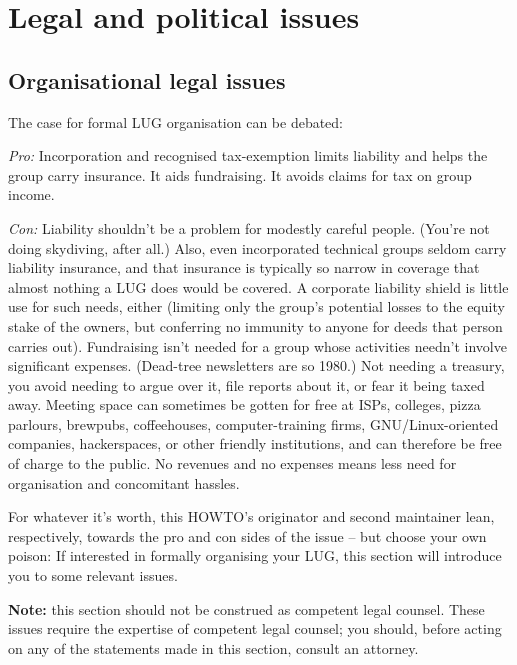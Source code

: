 

\section{Legal and political issues}






\subsection{Organisational legal issues}

The case for formal LUG organisation can be debated:

{\itshape Pro:\/} Incorporation and recognised tax-exemption limits
liability and helps the group carry insurance.  It aids fundraising.
It avoids claims for tax on group income.

{\itshape Con:\/} Liability shouldn't be a problem for modestly careful
people.  (You're not doing skydiving, after all.)  Also, even
incorporated technical groups seldom carry liability insurance, and that
insurance is typically so narrow in coverage that almost nothing a LUG
does would be covered.  A corporate liability shield is little use for
such needs, either (limiting only the group's potential losses to the
equity stake of the owners, but conferring no immunity to anyone for 
deeds that person carries out).  Fundraising isn't needed for a group whose
activities needn't involve significant expenses.  (Dead-tree newsletters
are so 1980.)  Not needing a treasury, you avoid needing to argue over
it, file reports about it, or fear it being taxed away. Meeting space
can sometimes be gotten for free at ISPs, colleges, pizza parlours,
brewpubs, coffeehouses, computer-training firms, GNU/Linux-oriented
companies, hackerspaces, or other friendly institutions, and can
therefore be free of charge to the public.  No revenues and no expenses
means less need for organisation and concomitant hassles.

For whatever it's worth, this HOWTO's originator and second maintainer lean,
respectively, towards the pro and con sides of the issue -- but choose
your own poison:  If interested in formally organising your LUG, this
section will introduce you to some relevant issues.

{\bfseries Note:} this section should not be construed as competent legal
counsel. These issues require the expertise of competent legal
counsel; you should, before acting on any of the statements made in
this section, consult an attorney.






